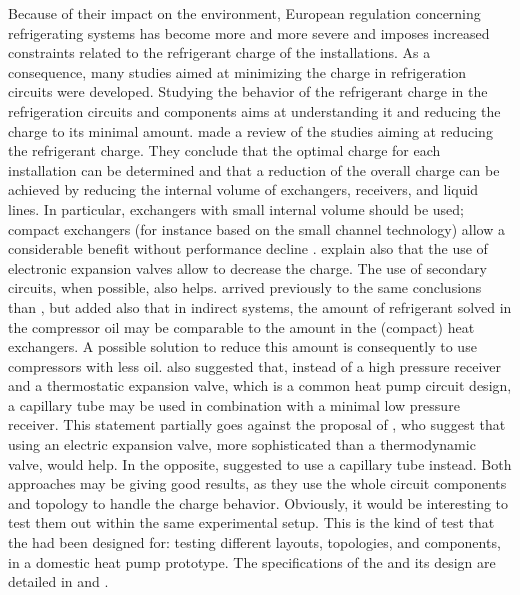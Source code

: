 Because of their impact on the environment, European regulation
concerning refrigerating systems has become more and more severe and
imposes increased constraints related to the refrigerant charge of the
installations. As a consequence, many studies aimed at minimizing the
charge in refrigeration circuits were developed. Studying the behavior
of the refrigerant charge in the refrigeration circuits and components
aims at understanding it and reducing the charge to its minimal
amount. \citet{Poggi-Bontemps-2008a} made a review of the studies
aiming at reducing the refrigerant charge. They conclude that the
optimal charge for each installation can be determined and that a
reduction of the overall charge can be achieved by reducing the
internal volume of exchangers, receivers, and liquid lines. In
particular, exchangers with small internal volume should be used;
compact exchangers (for instance based on the small channel
technology) allow a considerable benefit without performance decline
\citep[p.\,367]{Poggi-Bontemps-2008a}. \citet{Poggi-Bontemps-2008a}
explain also that the use of electronic expansion valves allow to
decrease the charge. The use of secondary circuits, when possible,
also helps. \citet{Palm-2007a} arrived previously to the same
conclusions than \citet{Poggi-Bontemps-2008a}, but added also that in
indirect systems, the amount of refrigerant solved in the compressor
oil may be comparable to the amount in the (compact) heat
exchangers. A possible solution to reduce this amount is consequently
to use compressors with less oil. \citet{Palm-2007a} also suggested
that, instead of a high pressure receiver and a thermostatic expansion
valve, which is a common heat pump circuit design, a capillary tube
may be used in combination with a minimal low pressure receiver. This
statement partially goes against the proposal of
\citet{Poggi-Bontemps-2008a}, who suggest that using an electric
expansion valve, more sophisticated than a thermodynamic valve, would
help. In the opposite, \citet{Palm-2007a} suggested to use a capillary
tube instead. Both approaches may be giving good results, as they use
the whole circuit components and topology to handle the charge
behavior. Obviously, it would be interesting to test them out within
the same experimental setup. This is the kind of test that the \BWP{}
had been designed for: testing different layouts, topologies, and
components, in a domestic heat pump prototype. The specifications of
the \BWP{} and its design are detailed in  and
.

